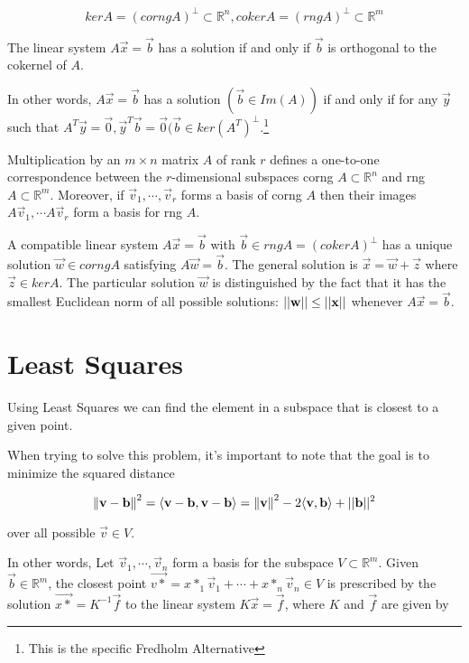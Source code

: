             \[ ker A = (corng A)^\bot \subset \mathbb{R}^n, coker A = (rng A)^\bot \subset \mathbb{R}^m \]

        The linear system $A\vec{x} = \vec{b}$ has a solution if and only if $\vec{b}$ is orthogonal to the cokernel of $A$.

        In other words, $A\vec{x} = \vec{b}$ has a solution $(\vec{b} \in Im(A))$ if and only if for any $\vec{y}$ such that $A^T\vec{y} = \vec{0}, \vec{y}^T\vec{b}=\vec{0}(\vec{b} \in ker(A^T)^\perp$.\footnote{This is the specific Fredholm Alternative}

        Multiplication by an $m \times n$ matrix $A$ of rank $r$ defines a one-to-one correspondence between the $r$-dimensional subspaces corng $A \subset \mathbb{R}^n$ and rng $A \subset \mathbb{R}^m$. Moreover, if $\vec{v}_1, \cdots, \vec{v}_r$ forms a basis of corng $A$ then their images $A \vec{v}_1, \cdots A \vec{v}_r$ form a basis for rng $A$.

        A compatible linear system $A \vec{x} = \vec{b}$ with $\vec{b} \in rng A = (coker A)^\bot$ has a unique solution $\vec{w} \in corng A$ satisfying $A \vec{w} = \vec{b}$. The general solution is $\vec{x} = \vec{w} + \vec{z}$ where $\vec{z} \in ker A$. The particular solution $\vec{w}$ is distinguished by the fact that it has the smallest Euclidean norm of all possible solutions: $\lvert \lvert \mathbf{w} \rvert \rvert \le \lvert \lvert \mathbf{x} \rvert \rvert$ whenever $A \vec{x} = \vec{b}$.

\section{Least Squares}
Using Least Squares we can find the element in a subspace that is closest to a given point.

When trying to solve this problem, it's important to note that the goal is to minimize the squared distance

    \[ {\Vert \mathbf{v} - \mathbf{b} \Vert}^2 = \langle \mathbf{v} - \mathbf{b}, \mathbf{v} - \mathbf{b} \rangle = {\Vert \mathbf{v} \Vert}^2 - 2 \langle \mathbf{v}, \mathbf{b} \rangle + \lvert \lvert \mathbf{b} \rvert \rvert^2 \]

over all possible $\vec{v} \in V$.

In other words, Let $\vec{v}_1, \cdots, \vec{v}_n$ form a basis for the subspace $V \subset \mathbb{R}^m$. Given $\vec{b} \in \mathbb{R}^m$, the closest point $\vec{v*} = x*_1 \vec{v}_1 + \cdots + x*_n \vec{v}_n \in V$ is prescribed by the solution $\vec{x*} = K^{-1}\vec{f}$ to the linear system $K \vec{x} = \vec{f}$, where $K$ and $\vec{f}$ are given by

